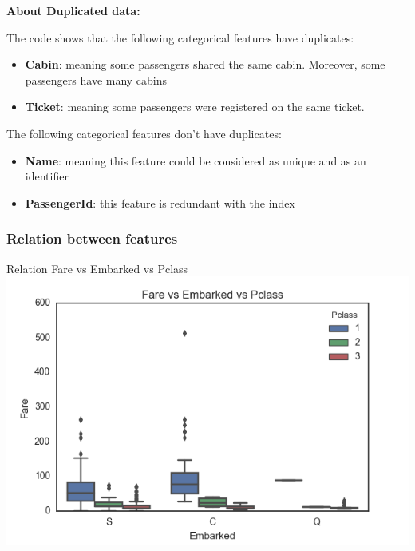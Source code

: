 \documentclass[11pt]{article}
\makeatletter
\def\maxwidth{\ifdim\Gin@nat@width>\linewidth\linewidth
    \else\Gin@nat@width\fi}
\let\Oldincludegraphics\includegraphics
\renewcommand{\includegraphics}[1]{\Oldincludegraphics[width=.8\maxwidth]{#1}}
\makeatother
\begin{document}
    \textbf{About Duplicated data:}

The code shows that the following categorical features have duplicates:

\begin{itemize}
\item
  \textbf{Cabin}: meaning some passengers shared the same cabin.
  Moreover, some passengers have many cabins
\item
  \textbf{Ticket}: meaning some passengers were registered on the same
  ticket.
\end{itemize}

The following categorical features don't have duplicates:

\begin{itemize}
\item
  \textbf{Name}: meaning this feature could be considered as unique and
  as an identifier
\item
  \textbf{PassengerId}: this feature is redundant with the index
\end{itemize}

    \subsubsection{Relation between
features}\label{relation-between-features}

    Relation Fare vs Embarked vs Pclass
\includegraphics{boxplotFarevsEmbarkedvsPclass.png}
\end{document}
